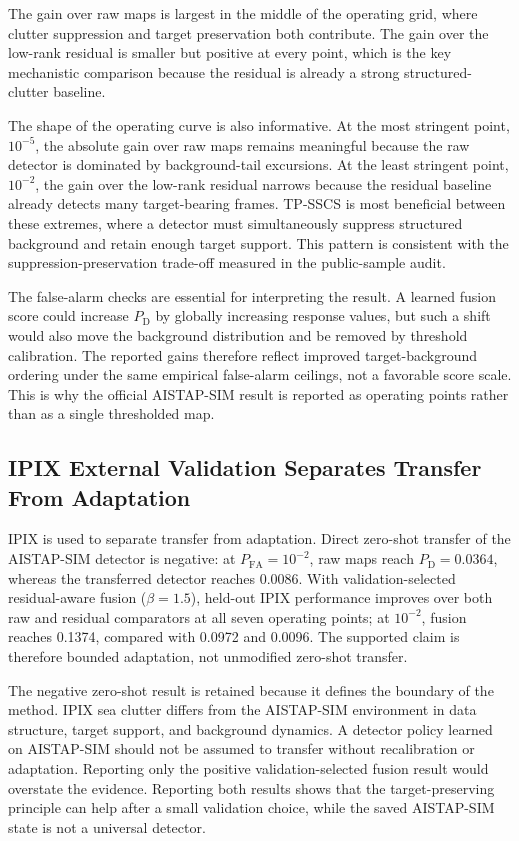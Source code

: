 \documentclass[journal]{IEEEtran}
\begin{document}
The gain over raw maps is largest in the middle of the operating grid, where clutter suppression and target preservation both contribute. The gain over the low-rank residual is smaller but positive at every point, which is the key mechanistic comparison because the residual is already a strong structured-clutter baseline.

The shape of the operating curve is also informative. At the most stringent point, $10^{-5}$, the absolute gain over raw maps remains meaningful because the raw detector is dominated by background-tail excursions. At the least stringent point, $10^{-2}$, the gain over the low-rank residual narrows because the residual baseline already detects many target-bearing frames. TP-SSCS is most beneficial between these extremes, where a detector must simultaneously suppress structured background and retain enough target support. This pattern is consistent with the suppression-preservation trade-off measured in the public-sample audit.

The false-alarm checks are essential for interpreting the result. A learned fusion score could increase $P_{\mathrm{D}}$ by globally increasing response values, but such a shift would also move the background distribution and be removed by threshold calibration. The reported gains therefore reflect improved target-background ordering under the same empirical false-alarm ceilings, not a favorable score scale. This is why the official AISTAP-SIM result is reported as operating points rather than as a single thresholded map.

\subsection{IPIX External Validation Separates Transfer From Adaptation}

IPIX is used to separate transfer from adaptation. Direct zero-shot transfer of the AISTAP-SIM detector is negative: at $P_{\mathrm{FA}}=10^{-2}$, raw maps reach $P_{\mathrm{D}}=0.0364$, whereas the transferred detector reaches 0.0086. With validation-selected residual-aware fusion ($\beta=1.5$), held-out IPIX performance improves over both raw and residual comparators at all seven operating points; at $10^{-2}$, fusion reaches 0.1374, compared with 0.0972 and 0.0096. The supported claim is therefore bounded adaptation, not unmodified zero-shot transfer.

The negative zero-shot result is retained because it defines the boundary of the method. IPIX sea clutter differs from the AISTAP-SIM environment in data structure, target support, and background dynamics. A detector policy learned on AISTAP-SIM should not be assumed to transfer without recalibration or adaptation. Reporting only the positive validation-selected fusion result would overstate the evidence. Reporting both results shows that the target-preserving principle can help after a small validation choice, while the saved AISTAP-SIM state is not a universal detector.
\end{document}
